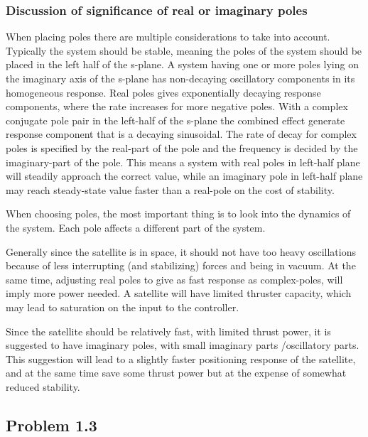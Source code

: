 \subsubsection*{Discussion of significance of real or imaginary poles}

When placing poles there are multiple considerations to take into account. Typically the system should be stable, meaning the poles of the system should be placed in the left half of the s-plane. A system having one or more poles lying on the imaginary axis of the s-plane has non-decaying oscillatory components in its homogeneous response. Real poles gives exponentially decaying response components, where the rate increases for more negative poles. With a complex conjugate pole pair in the left-half of the s-plane the combined effect generate response component that is a decaying sinusoidal. The rate of decay for complex poles is specified by the real-part of the pole and the frequency is decided by the imaginary-part of the pole. This means a system with real poles in left-half plane will steadily approach the correct value, while an imaginary pole in left-half plane may reach steady-state value faster than a real-pole on the cost of stability. 

When choosing poles, the most important thing is to look into the dynamics of the system. Each pole affects a different part of the system.  

Generally since the satellite is in space, it should not have too heavy oscillations because of less interrupting (and stabilizing) forces and being in vacuum. At the same time, adjusting real poles to give as fast response as complex-poles, will imply more power needed. A satellite will have limited thruster capacity, which may lead to saturation on the input to the controller.

Since the satellite should be relatively fast, with limited thrust power, it is suggested to have imaginary poles, with small imaginary parts /oscillatory parts. This suggestion will lead to a slightly faster positioning response of the satellite, and at the same time save some thrust power but at the expense of somewhat reduced stability.   

\subsection*{Problem 1.3}

